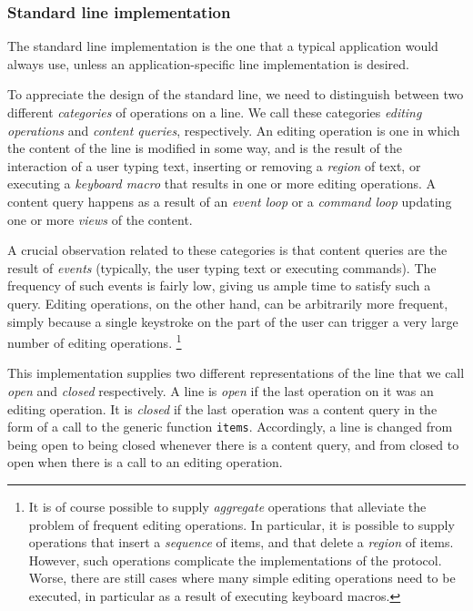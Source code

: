 \subsubsection{Standard line implementation}

The standard line implementation is the one that a typical application
would always use, unless an application-specific line implementation
is desired.

To appreciate the design of the standard line, we need to distinguish
between two different \emph{categories} of operations on a line.  We
call these categories \emph{editing operations} and \emph{content
  queries}, respectively.  An editing operation is one in which the
content of the line is modified in some way, and is the result of the
interaction of a user typing text, inserting or removing a
\emph{region} of text, or executing a \emph{keyboard macro} that
results in one or more editing operations.  A content query happens
as a result of an \emph{event loop} or a \emph{command loop} updating
one or more \emph{views} of the content.

A crucial observation related to these categories is that content
queries are the result of \emph{events} (typically, the user typing
text or executing commands).  The frequency of such events is fairly
low, giving us ample time to satisfy such a query.  Editing
operations, on the other hand, can be arbitrarily more frequent,
simply because a single keystroke on the part of the user can trigger
a very large number of editing operations.%
\footnote{It is of course possible to supply \emph{aggregate}
  operations that alleviate the problem of frequent editing
  operations.  In particular, it is possible to supply operations that
  insert a \emph{sequence} of items, and that delete a \emph{region}
  of items.  However, such operations complicate the implementations
  of the protocol.  Worse, there are still cases where many simple
  editing operations need to be executed, in particular as a result of
  executing keyboard macros.}

This implementation supplies two different representations of the line
that we call \emph{open} and \emph{closed} respectively.  A line is
\emph{open} if the last operation on it was an editing operation.  It
is \emph{closed} if the last operation was a content query in the
form of a call to the generic function \texttt{items}.  Accordingly, a
line is changed from being open to being closed whenever there is a
content query, and from closed to open when there is a call to an
editing operation.

